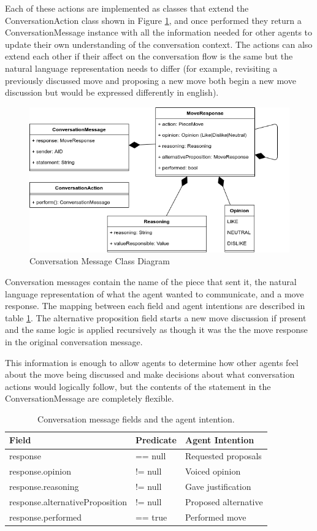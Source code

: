 \documentclass{article}
\begin{document}
Each of these actions are implemented as classes that extend the ConversationAction class shown in Figure \ref{fig:conversationmessage}, and once performed they return a ConversationMessage instance with all the information needed for other agents to update their own understanding of the conversation context. The actions can also extend each other if their affect on the conversation flow is the same but the natural language representation needs to differ (for example, revisiting a previously discussed move and proposing a new move both begin a new move discussion but would be expressed differently in english).

\begin{figure}[]
	\centering
	\includegraphics[width=0.8\linewidth]{images/conversationmessage}
	\caption{Conversation Message Class Diagram}
	\label{fig:conversationmessage}
\end{figure}

Conversation messages contain the name of the piece that sent it, the natural language representation of what the agent wanted to communicate, and a move response. The mapping between each field and agent intentions are described in table \ref{tbl:conversationmessagemeaning}. The alternative proposition field starts a new move discussion if present and the same logic is applied recursively as though it was the the move response in the original conversation message.

This information is enough to allow agents to determine how other agents feel about the move being discussed and make decisions about what conversation actions would logically follow, but the contents of the statement in the ConversationMessage are completely flexible.

\begin{table} 
\centering
\caption{Conversation message fields and the agent intention.} 
\label{tbl:conversationmessagemeaning}
\begin{tabular}{ l|l|l } 
	Field & Predicate & Agent Intention \\
 \hline
	response & == null & Requested proposals \\ 
	response.opinion & != null & Voiced opinion \\ 
	response.reasoning & != null & Gave justification \\ 
	response.alternativeProposition & != null & Proposed alternative \\ 
	response.performed & == true & Performed move \\ 
 \hline
\end{tabular}
\end{table}
\end{document}
